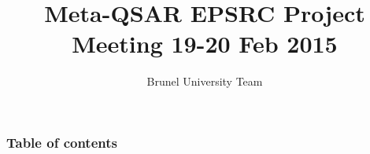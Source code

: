 \documentclass[compress]{beamer}
\title[Meta-QSAR EPSRC Project Meeting 19-20 Feb 2015] %
{Meta-QSAR EPSRC Project Meeting 19-20 Feb 2015}
\author[Brunel University Team] %
{Brunel University Team}
\institute[Brunel University - London] %
{
  Dept of Computer Science\\
  Brunel University 
}
\date[\today] %
\begin{document}
\begin{frame}
\titlepage
\end{frame} 

\begin{frame}
\frametitle{Table of contents}
\tableofcontents
\end{frame}
 

\end{document}
